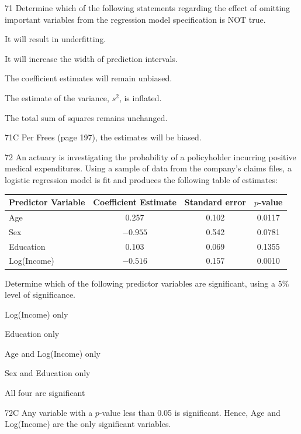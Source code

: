 \begin{question}{71}
Determine which of the following statements regarding the effect of omitting important variables from the regression model specification is NOT true.

\begin{choices}
\item It will result in underfitting.
\item It will increase the width of prediction intervals.
\item The coefficient estimates will remain unbiased.
\item The estimate of the variance, $s^2$, is inflated.
\item The total sum of squares remains unchanged.
\end{choices}
\end{question}
\begin{solution}{71}{C}
Per Frees (page 197), the estimates will be biased.
\end{solution}

\begin{question}{72}
An actuary is investigating the probability of a policyholder incurring positive medical expenditures. Using a sample of data from the company's claims files, a logistic regression model is fit and produces the following table of estimates:
\begin{center}
\begin{tabular}{|l|c|c|c|}
\hline
Predictor Variable & Coefficient Estimate & Standard error & $p$-value \\ \hline
Age & 0.257 & 0.102 & 0.0117 \\ \hline
Sex & $-0.955$ & 0.542 & 0.0781 \\ \hline
Education & 0.103 & 0.069 & 0.1355 \\ \hline
Log(Income) & $-0.516$ & 0.157 & 0.0010 \\ \hline
\end{tabular}
\end{center}

Determine which of the following predictor variables are significant, using a 5\% level of significance.

\begin{choices}
\item Log(Income) only
\item Education only
\item Age and Log(Income) only
\item Sex and Education only
\item All four are significant
\end{choices}
\end{question}
\begin{solution}{72}{C}
Any variable with a $p$-value less than 0.05 is significant. Hence, Age and Log(Income) are the only significant variables.
\end{solution}

